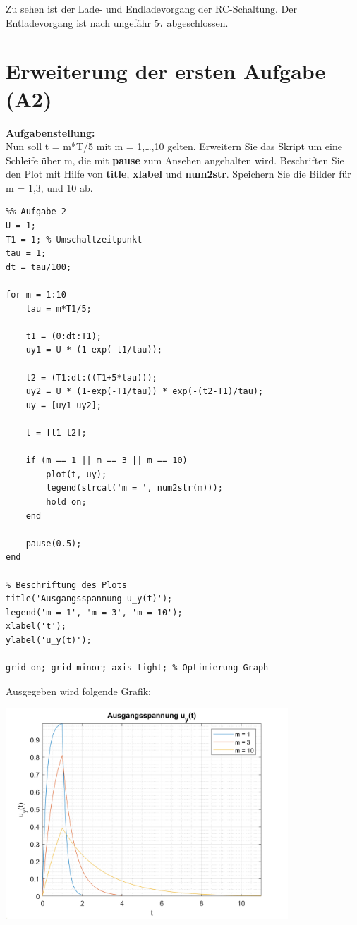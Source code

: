 Zu sehen ist der Lade- und Endladevorgang der RC-Schaltung. Der Entladevorgang ist nach ungefähr $5\tau$ abgeschlossen.

\vspace{0.5cm}

\section{Erweiterung der ersten Aufgabe (A2)}

\textbf{Aufgabenstellung:\\}
Nun soll t = m*T/5 mit m = 1,…,10 gelten. Erweitern Sie das Skript um eine Schleife über m, die mit \textbf{pause} zum Ansehen angehalten wird. Beschriften Sie den Plot mit Hilfe von \textbf{title}, \textbf{xlabel} und \textbf{num2str}. Speichern Sie die Bilder für m = 1,3, und 10 ab.

\vspace{1.5cm}

\begin{lstlisting}
%% Aufgabe 2
U = 1; 
T1 = 1; % Umschaltzeitpunkt
tau = 1; 
dt = tau/100;

for m = 1:10
	tau = m*T1/5;
	
	t1 = (0:dt:T1);
	uy1 = U * (1-exp(-t1/tau));
	
	t2 = (T1:dt:((T1+5*tau)));
	uy2 = U * (1-exp(-T1/tau)) * exp(-(t2-T1)/tau);
	uy = [uy1 uy2];
	
	t = [t1 t2];
	
	if (m == 1 || m == 3 || m == 10)
		plot(t, uy);
		legend(strcat('m = ', num2str(m)));
		hold on;
	end
	
	pause(0.5);	
end
	
% Beschriftung des Plots
title('Ausgangsspannung u_y(t)');
legend('m = 1', 'm = 3', 'm = 10');
xlabel('t');
ylabel('u_y(t)');

grid on; grid minor; axis tight; % Optimierung Graph
\end{lstlisting}

\vspace{1cm}

Ausgegeben wird folgende Grafik:

\begin{center}
	\includegraphics[width=300pt]{img/aufgabe2.png}
\end{center}

